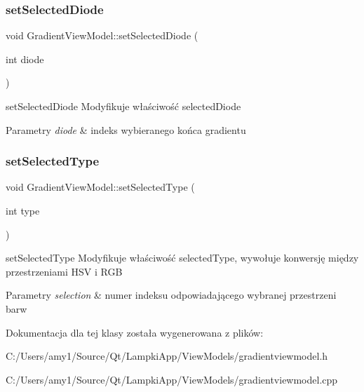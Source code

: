 \subsubsection{\texorpdfstring{set\+Selected\+Diode}{setSelectedDiode}}
{\footnotesize\ttfamily void Gradient\+View\+Model\+::set\+Selected\+Diode (\begin{DoxyParamCaption}\item[{int}]{diode }\end{DoxyParamCaption})\hspace{0.3cm}{\ttfamily [slot]}}



set\+Selected\+Diode Modyfikuje właściwość selected\+Diode 


\begin{DoxyParams}{Parametry}
{\em diode} & indeks wybieranego końca gradientu \\
\hline
\end{DoxyParams}
\mbox{\label{class_gradient_view_model_ad90c266ab078a0701788f2a7a9c7f2be}} 
\subsubsection{\texorpdfstring{set\+Selected\+Type}{setSelectedType}}
{\footnotesize\ttfamily void Gradient\+View\+Model\+::set\+Selected\+Type (\begin{DoxyParamCaption}\item[{int}]{type }\end{DoxyParamCaption})\hspace{0.3cm}{\ttfamily [slot]}}



set\+Selected\+Type Modyfikuje właściwość selected\+Type, wywołuje konwersję między przestrzeniami H\+SV i R\+GB 


\begin{DoxyParams}{Parametry}
{\em selection} & numer indeksu odpowiadającego wybranej przestrzeni barw \\
\hline
\end{DoxyParams}


Dokumentacja dla tej klasy została wygenerowana z plików\+:\begin{DoxyCompactItemize}
\item 
C\+:/\+Users/amy1/\+Source/\+Qt/\+Lampki\+App/\+View\+Models/gradientviewmodel.\+h\item 
C\+:/\+Users/amy1/\+Source/\+Qt/\+Lampki\+App/\+View\+Models/gradientviewmodel.\+cpp\end{DoxyCompactItemize}
